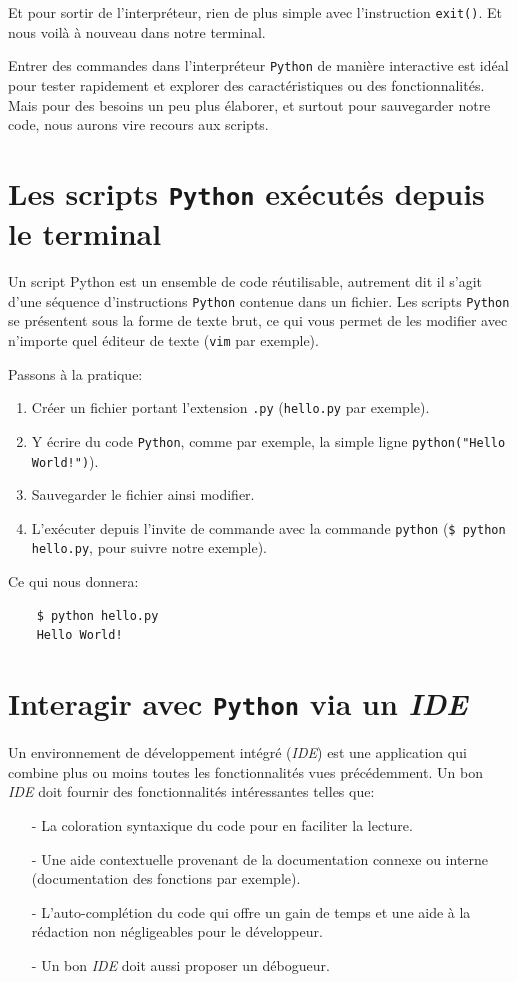 \documentclass[a4paper,12pt]{book}
\begin{document}
Et pour sortir de l'interpréteur, rien de plus simple avec l'instruction \texttt{exit()}. Et nous voilà à nouveau dans notre terminal.
\medskip

Entrer des commandes dans l'interpréteur \texttt{Python} de manière interactive est idéal pour tester rapidement et explorer des caractéristiques ou des fonctionnalités. Mais pour des besoins un peu plus élaborer, et surtout pour sauvegarder notre code, nous aurons vire recours aux scripts.
\medskip

\section{Les scripts \texttt{Python} exécutés depuis le terminal}
Un script Python est un ensemble de code réutilisable, autrement dit il s'agit d'une séquence d'instructions \texttt{Python} contenue dans un fichier. Les scripts \texttt{Python} se présentent sous la forme de texte brut, ce qui vous permet de les modifier avec n'importe quel éditeur de texte (\texttt{vim} par exemple).
\medskip

Passons à la pratique:
\begin{enumerate}
	\item Créer un fichier portant l'extension \texttt{.py} (\texttt{hello.py} par exemple).
	\item Y écrire du code \texttt{Python}, comme par exemple, la simple ligne \texttt{python("Hello World!")}).
	\item Sauvegarder le fichier ainsi modifier.
	\item L'exécuter depuis l'invite de commande avec la commande \texttt{python} (\verb|$ python hello.py|, pour suivre notre exemple).
\end{enumerate}
\medskip

Ce qui nous donnera:
\begin{verbatim}
    $ python hello.py
    Hello World!
\end{verbatim}

\section{Interagir avec \texttt{Python} via un \textit{IDE}}
Un environnement de développement intégré (\textit{IDE}) est une application qui combine plus ou moins toutes les fonctionnalités vues précédemment. Un bon \textit{IDE} doit fournir des fonctionnalités intéressantes telles que:
\begin{itemize}
	\item[-] La coloration syntaxique du code pour en faciliter la lecture.
	\item[-] Une aide contextuelle provenant de la documentation connexe ou interne (documentation des fonctions par exemple).
	\item[-] L'auto-complétion du code qui offre un gain de temps et une aide à la rédaction non négligeables pour le développeur.
	\item[-] Un bon \textit{IDE} doit aussi proposer un débogueur.
\end{itemize}
\medskip
\end{document}
